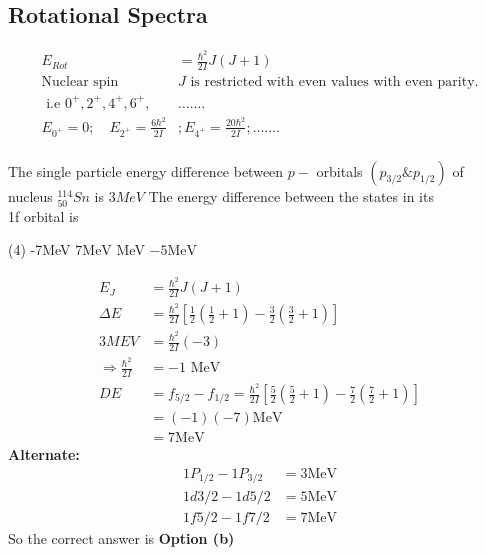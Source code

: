 \subsection{Rotational Spectra}
\begin{align*}
E_{R o t}&=\frac{\hbar^{2}}{2 I} J(J+1)\\
\text{Nuclear spin }&\text{$J$ is restricted with even values with even parity.}\\
\text { i.e } 0^{+}, 2^{+} , 4 ^{+}, 6 ^{+},& \ldots . \ldots\\
E_{0^{+}}=0 ; \quad E_{2^{+}}=\frac{6 \hbar^{2}}{2 I} &; E_{4^{+}}=\frac{20 \hbar^{2}}{2 I} ; \ldots . \ldots\\
\end{align*}
\begin{exercise}
	The single particle energy difference between $p-$ orbitals $\left(p_{3 / 2} \& p_{1 / 2}\right)$ of nucleus ${}^{114}_{50}Sn$ is $3MeV$ The energy difference between the states in its \\
	1f orbital is 
	 \begin{tasks}(4)
		\task[\textbf{a.}]-7MeV
		\task[\textbf{b.}]$7 \mathrm{MeV}$
		 MeV
		\task[\textbf{d.}] $-5 \mathrm{MeV}$
	\end{tasks}
\end{exercise}
\begin{answer}
	\begin{align*}
	E_{J}&=\frac{\hbar^{2}}{2 I} J(J+1)\\
	\Delta E&=\frac{\hbar^{2}}{2 I}\left[\frac{1}{2}\left(\frac{1}{2}+1\right)-\frac{3}{2}\left(\frac{3}{2}+1\right)\right]\\
	3 M E V&=\frac{\hbar^{2}}{2 I}(-3)\\
	\Rightarrow \frac{\hbar^{2}}{2 I}&=-1 \text { MeV }\\
	D E&=f_{5 / 2}-f_{1 / 2}=\frac{\hbar^{2}}{2 I}\left[\frac{5}{2}\left(\frac{5}{2}+1\right)-\frac{7}{2}\left(\frac{7}{2}+1\right)\right]\\
	&=(-1)(-7) \mathrm{MeV}\\
	&=7 \mathrm{MeV}
	\end{align*}
\textbf{	Alternate:}
	\begin{align*}
	1 P_{1 / 2}-1 P_{3 / 2}&=3 \mathrm{MeV}\\
	1d{ 3 / 2}-1 d{5/2}&=5 \mathrm{MeV}\\
	1f{ 5 / 2}-1 f{7/2}&=7 \mathrm{MeV}
	\end{align*}
	So the correct answer is \textbf{Option (b)}
\end{answer}
